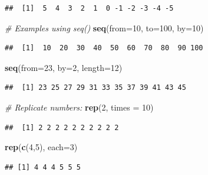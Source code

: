 \documentclass[]{book}
\newenvironment{Shaded}{\begin{snugshade}}{\end{snugshade}}
\newcommand{\CommentTok}[1]{\textcolor[rgb]{0.56,0.35,0.01}{\textit{#1}}}
\newcommand{\DataTypeTok}[1]{\textcolor[rgb]{0.13,0.29,0.53}{#1}}
\newcommand{\DecValTok}[1]{\textcolor[rgb]{0.00,0.00,0.81}{#1}}
\newcommand{\KeywordTok}[1]{\textcolor[rgb]{0.13,0.29,0.53}{\textbf{#1}}}
\newcommand{\NormalTok}[1]{#1}
\begin{document}
\begin{verbatim}
##  [1]  5  4  3  2  1  0 -1 -2 -3 -4 -5
\end{verbatim}

\begin{Shaded}
\begin{Highlighting}[]
\CommentTok{# Examples using seq()}
\KeywordTok{seq}\NormalTok{(}\DataTypeTok{from=}\DecValTok{10}\NormalTok{, }\DataTypeTok{to=}\DecValTok{100}\NormalTok{, }\DataTypeTok{by=}\DecValTok{10}\NormalTok{)}
\end{Highlighting}
\end{Shaded}

\begin{verbatim}
##  [1]  10  20  30  40  50  60  70  80  90 100
\end{verbatim}

\begin{Shaded}
\begin{Highlighting}[]
\KeywordTok{seq}\NormalTok{(}\DataTypeTok{from=}\DecValTok{23}\NormalTok{, }\DataTypeTok{by=}\DecValTok{2}\NormalTok{, }\DataTypeTok{length=}\DecValTok{12}\NormalTok{)}
\end{Highlighting}
\end{Shaded}

\begin{verbatim}
##  [1] 23 25 27 29 31 33 35 37 39 41 43 45
\end{verbatim}

\begin{Shaded}
\begin{Highlighting}[]
\CommentTok{# Replicate numbers:}
\KeywordTok{rep}\NormalTok{(}\DecValTok{2}\NormalTok{, }\DataTypeTok{times =} \DecValTok{10}\NormalTok{)}
\end{Highlighting}
\end{Shaded}

\begin{verbatim}
##  [1] 2 2 2 2 2 2 2 2 2 2
\end{verbatim}

\begin{Shaded}
\begin{Highlighting}[]
\KeywordTok{rep}\NormalTok{(}\KeywordTok{c}\NormalTok{(}\DecValTok{4}\NormalTok{,}\DecValTok{5}\NormalTok{), }\DataTypeTok{each=}\DecValTok{3}\NormalTok{)}
\end{Highlighting}
\end{Shaded}

\begin{verbatim}
## [1] 4 4 4 5 5 5
\end{verbatim}
\end{document}
